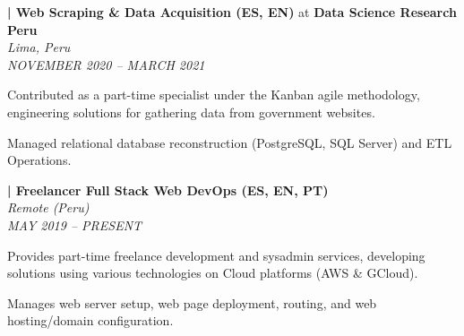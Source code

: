\item \label{job:scraping}
\textbf{\thejobcounter | Web Scraping \& Data Acquisition (ES, EN)} at \textbf{Data Science Research Peru} \\
\textit{Lima, Peru} \\
\textit{NOVEMBER 2020 -- MARCH 2021}
\resumeItemListStart
    \item Contributed as a part-time specialist under the Kanban agile methodology, engineering solutions for gathering data from government websites.
    \item Managed relational database reconstruction (PostgreSQL, SQL Server) and ETL Operations.
\resumeItemListEnd

\item \label{job:freelance}
\textbf{\thejobcounter | Freelancer Full Stack Web DevOps (ES, EN, PT)} \\
\textit{Remote (Peru)} \\
\textit{MAY 2019 -- PRESENT}
\resumeItemListStart
    \item Provides part-time freelance development and sysadmin services, developing solutions using various technologies on Cloud platforms (AWS \& GCloud).
    \item Manages web server setup, web page deployment, routing, and web hosting/domain configuration.
\resumeItemListEnd